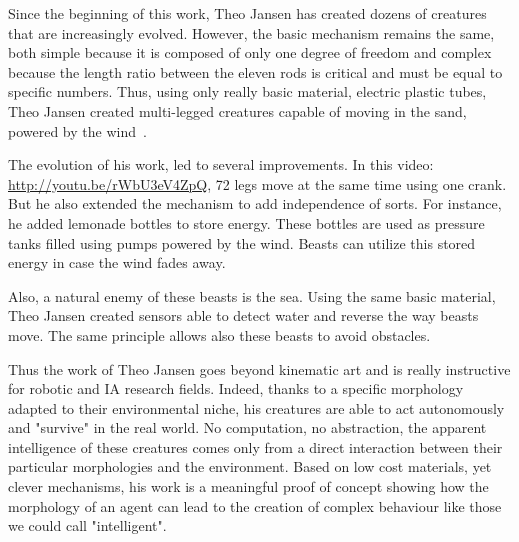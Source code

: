 Since the beginning of this work, Theo Jansen has created dozens of creatures that are increasingly evolved. However, the basic mechanism remains the same, both simple because it is composed of only one degree of freedom and complex because the length ratio between the eleven rods is critical and must be equal to specific numbers. Thus, using only really basic material, electric plastic tubes, Theo Jansen created multi-legged creatures capable of moving in the sand, powered by the wind~\parencite{jansen2007theo}.


The evolution of his work, led to several improvements. In this video: \url{http://youtu.be/rWbU3eV4ZpQ}, 72 legs move at the same time using one crank. But he also extended the mechanism to add independence of sorts. For instance, he added lemonade bottles to store energy. These bottles are used as pressure tanks filled using pumps powered by the wind. Beasts can utilize this stored energy in case the wind fades away.

Also, a natural enemy of these beasts is the sea. Using the same basic material, Theo Jansen created sensors able to detect water and reverse the way beasts move. The same principle allows also these beasts to avoid obstacles.

Thus the work of Theo Jansen goes beyond kinematic art and is really instructive for robotic and IA research fields. Indeed, thanks to a specific morphology adapted to their environmental niche, his creatures are able to act autonomously and "survive" in the real world. No computation, no abstraction, the apparent intelligence of these creatures comes only  from a direct interaction between their particular morphologies and the environment. Based on low cost materials, yet clever mechanisms, his work is a meaningful proof of concept showing how the morphology of an agent can lead to the creation of complex behaviour like those we could call "intelligent".





